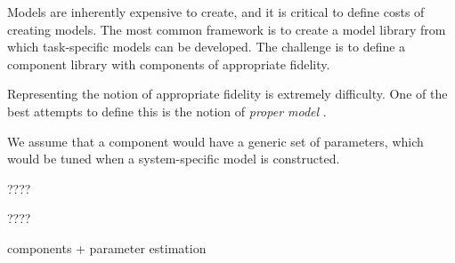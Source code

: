 Models are inherently expensive to create, and it is critical to define costs of creating models. The most common  framework is to create a model library from which task-specific models can be developed. The challenge is to define a component library with components of appropriate fidelity. 

Representing the notion of appropriate fidelity is extremely difficulty. One of the best attempts to define this is the notion of \textit{proper model} \cite{??}.


We assume that a component would have a generic set of parameters, which would be tuned when a system-specific model is constructed.


\begin{definition}
????
\end{definition}

\begin{definition}
????

components + parameter estimation

\end{definition}













